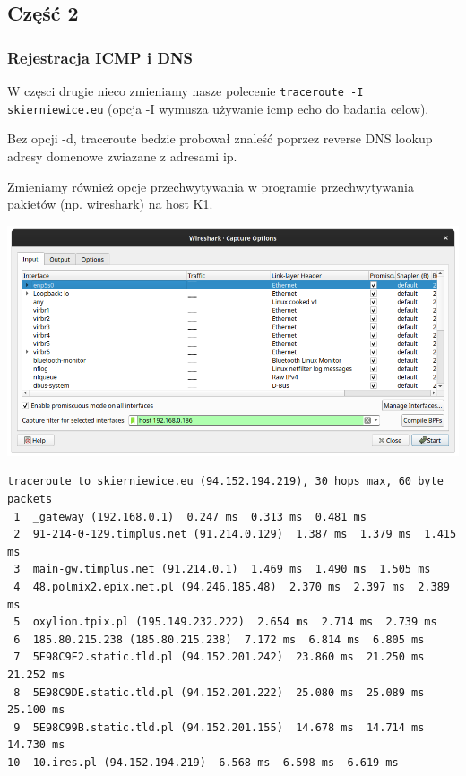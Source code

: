 \documentclass[11pt]{article}
\begin{document}
\subsection{Część 2}
\label{sec:org03fdbfe}
\subsubsection{Rejestracja ICMP i DNS}
\label{sec:org34c80ad}
W częsci drugie nieco zmieniamy nasze polecenie \texttt{traceroute -I skierniewice.eu} (opcja -I wymusza używanie icmp echo do badania celow).

Bez opcji -d, traceroute bedzie probował znaleść poprzez reverse DNS lookup adresy domenowe zwiazane z adresami ip.

Zmieniamy również opcje przechwytywania w programie przechwytywania pakietów (np. wireshark) na host K1.
\begin{center}
\includegraphics[width=.9\linewidth]{./part2/options.png}
\end{center}
\begin{verbatim}
traceroute to skierniewice.eu (94.152.194.219), 30 hops max, 60 byte packets
 1  _gateway (192.168.0.1)  0.247 ms  0.313 ms  0.481 ms
 2  91-214-0-129.timplus.net (91.214.0.129)  1.387 ms  1.379 ms  1.415 ms
 3  main-gw.timplus.net (91.214.0.1)  1.469 ms  1.490 ms  1.505 ms
 4  48.polmix2.epix.net.pl (94.246.185.48)  2.370 ms  2.397 ms  2.389 ms
 5  oxylion.tpix.pl (195.149.232.222)  2.654 ms  2.714 ms  2.739 ms
 6  185.80.215.238 (185.80.215.238)  7.172 ms  6.814 ms  6.805 ms
 7  5E98C9F2.static.tld.pl (94.152.201.242)  23.860 ms  21.250 ms  21.252 ms
 8  5E98C9DE.static.tld.pl (94.152.201.222)  25.080 ms  25.089 ms  25.100 ms
 9  5E98C99B.static.tld.pl (94.152.201.155)  14.678 ms  14.714 ms  14.730 ms
10  10.ires.pl (94.152.194.219)  6.568 ms  6.598 ms  6.619 ms
\end{verbatim}
\end{document}
